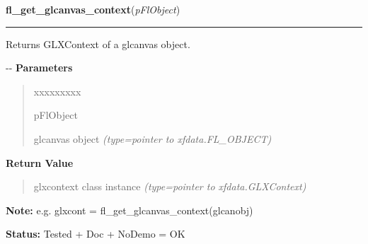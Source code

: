 \hspace{.8\funcindent}\begin{boxedminipage}{\funcwidth}

    \raggedright \textbf{fl\_get\_glcanvas\_context}(\textit{pFlObject})

    \vspace{-1.5ex}

    \rule{\textwidth}{0.5\fboxrule}
\setlength{\parskip}{2ex}

Returns GLXContext of a glcanvas object.

-{}-
\setlength{\parskip}{1ex}
      \textbf{Parameters}
      \vspace{-1ex}

      \begin{quote}
        \begin{Ventry}{xxxxxxxxx}

          \item[pFlObject]


glcanvas object
            {\it (type=pointer to xfdata.FL\_OBJECT)}

        \end{Ventry}

      \end{quote}

      \textbf{Return Value}
    \vspace{-1ex}

      \begin{quote}

glxcontext class instance
      {\it (type=pointer to xfdata.GLXContext)}

      \end{quote}

\textbf{Note:} 
e.g. glxcont = fl\_get\_glcanvas\_context(glcanobj)


\textbf{Status:} 
Tested + Doc + NoDemo = OK


    \end{boxedminipage}

    \label{xformslib:flglcanvas:fl_glwincreate}

    \vspace{0.5ex}

